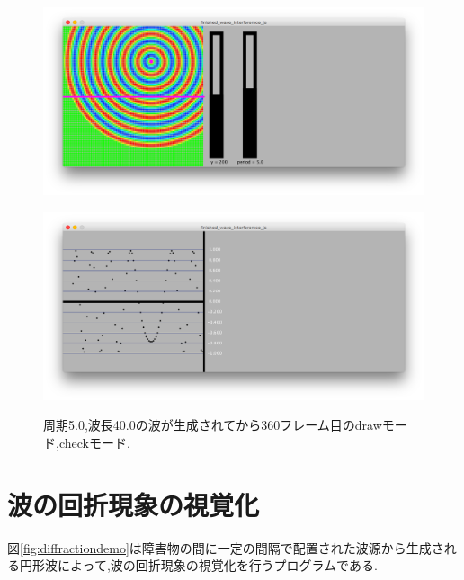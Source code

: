 \begin{figure}[H]
\begin{minipage}[b]{1.0\linewidth}
\centering
\includegraphics[keepaspectratio, scale=0.40]
  {../result/drawmode.png}
 \label{drawmode}
 \end{minipage}
 
\begin{minipage}[b]{1.0\linewidth}
\centering
  \includegraphics[keepaspectratio, scale=0.40]
  {../result/checkmode.png}
 \label{checkmode}
 \end{minipage}
  
  \caption{周期5.0,波長40.0の波が生成されてから360フレーム目のdrawモード,checkモード.}
 \label{fig:compare}
\end{figure}
\section{波の回折現象の視覚化}
\label{defraction}
図\ref{fig:diffractiondemo}は障害物の間に一定の間隔で配置された波源から生成される円形波によって,波の回折現象の視覚化を行うプログラムである.

